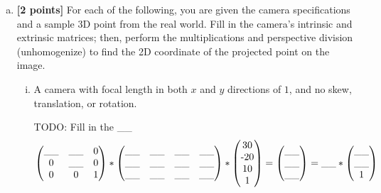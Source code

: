 \begin{enumerate}[(a)]
\item \textbf{[2 points]}
For each of the following, you are given the camera specifications and a sample 3D point from the real world. Fill in the camera's intrinsic and extrinsic matrices; then, perform the multiplications and perspective division (unhomogenize) to find the 2D coordinate of the projected point on the image.

\begin{enumerate} [(i)]
\item A camera with focal length in both $x$ and $y$ directions of $1$, and no skew, translation, or rotation.

\begin{mdframed}
TODO: Fill in the \_\_
\begin{align*}
    \begin{pmatrix} 
    \_\_ & \_\_ & $0$ \\ 
    $0$ & \_\_ & $0$ \\ 
    $0$ & $0$ & $1$ \end{pmatrix} *
    \begin{pmatrix} 
    \_\_ & \_\_ & \_\_ & \_\_ \\ 
    \_\_ & \_\_ & \_\_ & \_\_ \\ 
    \_\_ & \_\_ & \_\_ & \_\_ \end{pmatrix} * 
    \begin{pmatrix} 
    $30$ \\ 
    $-20$ \\ 
    $10$ \\ 
    $1$ \end{pmatrix}
    = \begin{pmatrix}  \_\_ \\ \_\_ \\ \_\_ \end{pmatrix}
    = \_\_ * \begin{pmatrix}  \_\_ \\ \_\_ \\ $1$ \end{pmatrix}
\end{align*}
\end{mdframed}


\end{enumerate}
\end{enumerate}
